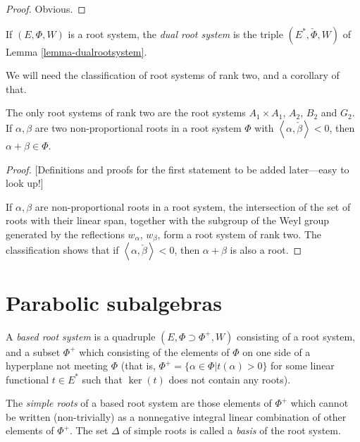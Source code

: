 \begin{proof}
 Obvious.
\end{proof}


\begin{definition}
 \label{definition-dual-rootsystem}
If $(E,\Phi, W)$ is a root system, the {\it dual root system} is the triple $(E^*,\check\Phi, W)$ of Lemma \ref{lemma-dualrootsystem}.
\end{definition}

We will need the classification of root systems of rank two, and a corollary of that.

\begin{proposition}
\label{proposition-ranktwo}
 The only root systems of rank two are the root systems $A_1\times A_1$, $A_2$, $B_2$ and $G_2$. If $\alpha,\beta$ are two non-proportional roots in a root system $\Phi$ with $\left< \alpha, \check\beta\right> < 0$, then 
$\alpha+\beta \in \Phi$.
\end{proposition}

\begin{proof}

[Definitions and proofs for the first statement to be added later---easy to look up!]

If $\alpha,\beta$ are non-proportional roots in a root system, the intersection of the set of roots with their linear span, together with the subgroup of the Weyl group generated by the reflections $w_\alpha$, $w_\beta$, form a root system of rank two. The classification shows that if $\left<\alpha, \check\beta\right> <0$, then $\alpha+\beta$ is also a root. 

\end{proof}



\section{Parabolic subalgebras}
\label{section-parabolic-subalgebras}

\begin{definition}
\label{definition-based-root-system}
 A {\it based root system} is a quadruple $(E,\Phi \supset \Phi^+, W)$ consisting of a root system, and a subset $\Phi^+$ which consisting of the elements of $\Phi$ on one side of a hyperplane not meeting $\Phi$ (that is, $\Phi^+ = \{\alpha\in\Phi| t(\alpha)>0\}$ for some linear functional $t\in E^*$ such that $\ker(t)$ does not contain any roots).
 
 The {\it simple roots} of a based root system are those elements of $\Phi^+$ which cannot be written (non-trivially) as a nonnegative integral linear combination of other elements of $\Phi^+$. The set $\Delta$ of simple roots is called a {\it basis} of the root system.
\end{definition}

